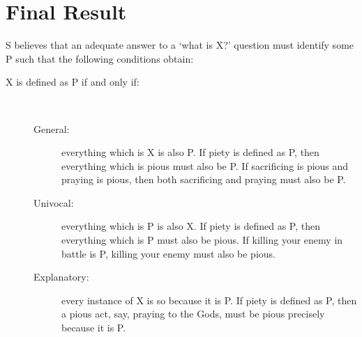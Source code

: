 \documentclass[oneside]{article}
\begin{document}
\section*{Final Result}
S believes that an adequate answer to a `what is X?' question must identify some P such that the following conditions obtain:
\begin{description}
\item[ X is defined as P if and only if:]\
\begin{description}
\item[General:] everything which is X is also P. If piety is defined as P, then everything which is pious must also be P. If sacrificing is pious and praying is pious, then both sacrificing and praying must also be P. 
\item[Univocal:] everything which is P is also X. If piety is defined as P, then everything which is P must also be pious. If killing your enemy in battle is P, killing your enemy must also be pious. 

\item[Explanatory:]  every instance of X is so because it is P. If piety is defined as P, then a pious act, say, praying to the Gods, must be pious precisely because it is P. 
\end{description}
\end{description}
\end{document}
